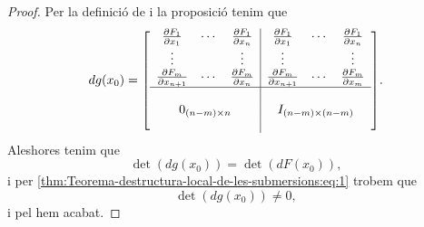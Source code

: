\documentclass[../../main.tex]{subfiles}
\begin{document}
\begin{proof}
        Per la definició de  i la proposició  tenim que
        \[dg(x_{0})=\left[\begin{array}{c|c}
            \begin{matrix}
                \frac{\partial F_{1}}{\partial x_{1}} & \cdots & \frac{\partial F_{1}}{\partial x_{n}} \\
                \vdots & & \vdots \\
                \frac{\partial F_{m}}{\partial x_{n+1}} & \cdots & \frac{\partial F_{m}}{\partial x_{n}}
            \end{matrix} & \begin{matrix}
                \frac{\partial F_{1}}{\partial x_{1}} & \cdots & \frac{\partial F_{1}}{\partial x_{n}} \\
                \vdots & & \vdots \\
                \frac{\partial F_{m}}{\partial x_{n+1}} & \cdots & \frac{\partial F_{m}}{\partial x_{m}}
            \end{matrix} \\ \hline \\
            0_{(n-m)\times n} & I_{(n-m)\times(n-m)} \\
            &
        \end{array}\right].\]
        Aleshores tenim que
        \[
            \det(dg(x_{0}))=\det(dF(x_{0})),
        \]
        i per \eqref{thm:Teorema-destructura-local-de-les-submersions:eq:1} trobem que
        \[
            \det(dg(x_{0}))\neq0,
        \]
        i pel  hem acabat.
    \end{proof}
\end{document}
